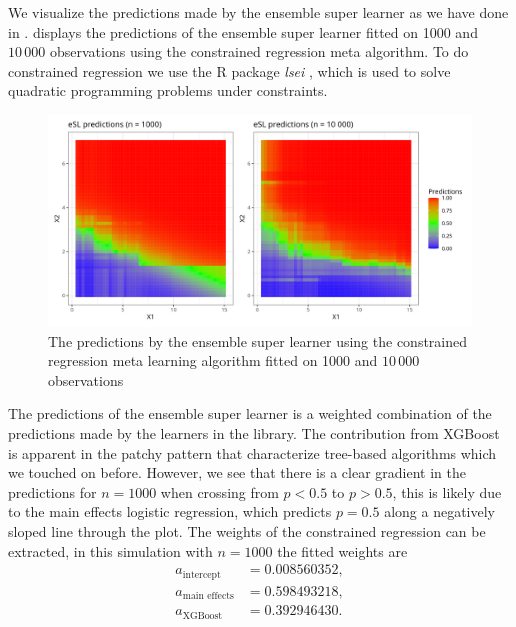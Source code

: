 \documentclass[./main.tex]{subfiles}
\begin{document}
We visualize the predictions made by the ensemble super learner as we have done in .  displays the predictions of the ensemble super learner fitted on 1000 and $ 10\,000 $ observations using the constrained regression meta algorithm. To do constrained regression we use the R package \textit{lsei} \parencite{lsei}, which is used to solve quadratic programming problems under constraints.  
\begin{figure}[H]
    \centering
    \includegraphics[width=\textwidth]{figures/esl_preds_par.png}
    \caption{The predictions by the ensemble super learner using the constrained regression meta learning algorithm fitted on 1000 and $ 10\,000 $ observations}
    \label{fig:esl_preds_quad_prog}
\end{figure}
The predictions of the ensemble super learner is a weighted combination of the predictions made by the learners in the library. The contribution from XGBoost is apparent in the patchy pattern that characterize tree-based algorithms which we touched on before. However, we see that there is a clear gradient in the predictions for $ n = 1000 $ when crossing from $ p < 0.5 $ to $ p > 0.5 $, this is likely due to the main effects logistic regression, which predicts $ p = 0.5 $ along a negatively sloped line through the plot. The weights of the constrained regression can be extracted, in this simulation with $ n = 1000 $ the fitted weights are
\begin{align*}
    a_{\text{intercept}} &=0.008560352, \\
    a_{\text{main effects}} &= 0.598493218, \\
    a_{\text{XGBoost}} &= 0.392946430.
\end{align*}
\end{document}
